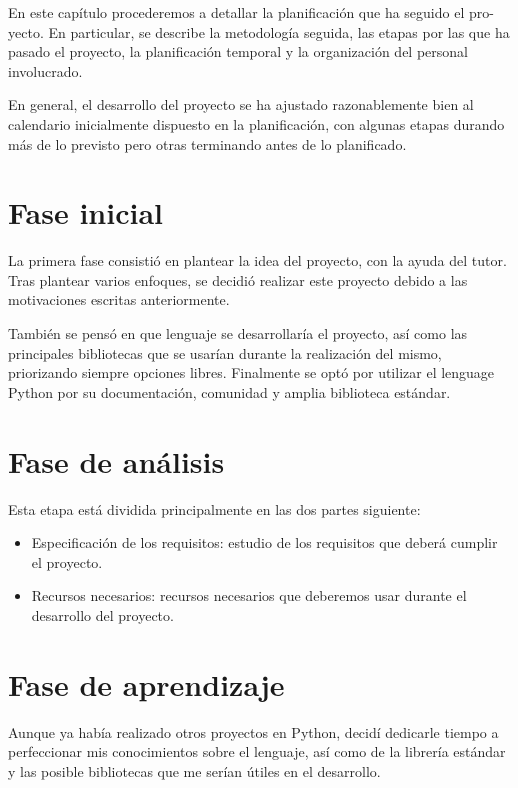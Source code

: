En este capítulo procederemos a detallar la planificación que ha seguido el pro-
yecto. En particular, se describe la metodología seguida, las etapas por las que
ha pasado el proyecto, la planificación temporal y la organización del personal
involucrado.

En general, el desarrollo del proyecto se ha ajustado razonablemente bien al calendario
inicialmente dispuesto en la planificación, con algunas etapas durando
más de lo previsto pero otras terminando antes de lo planificado.

\section{Fase inicial}

La primera fase consistió en plantear la idea del proyecto, con la ayuda del tutor. Tras plantear
varios enfoques, se decidió realizar este proyecto debido a las motivaciones escritas anteriormente.

También se pensó en que lenguaje se desarrollaría el proyecto, así como las principales bibliotecas que
se usarían durante la realización del mismo, priorizando siempre opciones libres. Finalmente se optó por
utilizar el lenguage Python por su documentación, comunidad y amplia biblioteca estándar.

\section{Fase de análisis}

Esta etapa está dividida principalmente en las dos partes siguiente:

\begin{itemize}
\item Especificación de los requisitos: estudio de los requisitos que deberá cumplir el proyecto.
\item Recursos necesarios: recursos necesarios que deberemos usar durante el desarrollo del proyecto.
\end{itemize}

\section{Fase de aprendizaje}

Aunque ya había realizado otros proyectos en Python, decidí dedicarle tiempo a perfeccionar mis conocimientos
sobre el lenguaje, así como de la librería estándar y las posible bibliotecas que me serían útiles en el desarrollo.

